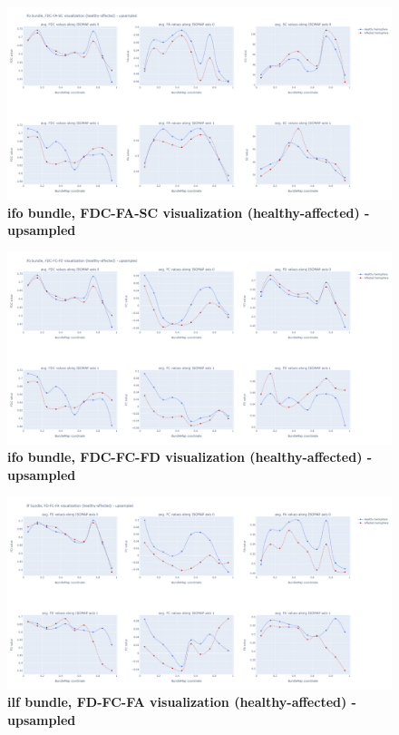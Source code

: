 \documentclass[thesis.tex]{subfiles}
\begin{document}
\begin{figure}
  \centering
  \includegraphics[width=24cm]{thesis_radomskyi/apendix/ifo bundle, FDC-FA-SC visualization (healthy-affected) - upsampled.png}
    \caption{\textbf{ifo bundle, FDC-FA-SC visualization (healthy-affected) - upsampled}}
\end{figure}

\begin{figure}
  \centering
  \includegraphics[width=24cm]{thesis_radomskyi/apendix/ifo bundle, FDC-FC-FD visualization (healthy-affected) - upsampled.png}
    \caption{\textbf{ifo bundle, FDC-FC-FD visualization (healthy-affected) - upsampled}}
\end{figure}

\begin{figure}
  \centering
  \includegraphics[width=24cm]{thesis_radomskyi/apendix/ilf bundle, FD-FC-FA visualization (healthy-affected) - upsampled.png}
    \caption{\textbf{ilf bundle, FD-FC-FA visualization (healthy-affected) - upsampled}}
\end{figure}
\end{document}
